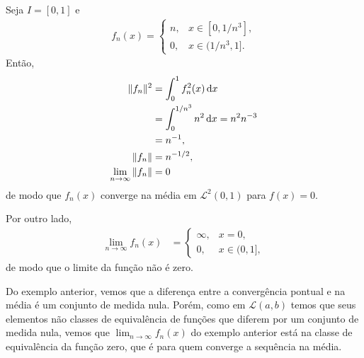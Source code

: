 \begin{exem}
    Seja $I = [0,1]$ e
    \begin{align*}
        f_n(x) = \begin{cases}
            n, & x \in [0, 1/n^3], \\
            0, & x \in (1/n^3, 1].
        \end{cases}
    \end{align*}
    Ent\~{a}o,
    \begin{align*}
        \| f_n \|^2 &= \int_0^1 f_n^2(x) \, \mathrm{d}x \\
        &= \int_0^{1/n^3} n^2 \, \mathrm{d}x = n^2 n^{-3} \\
        &= n^{-1}, \\
        \| f_n \| &= n^{-1/2}, \\
        \lim_{n \to \infty} \| f_n \| &= 0
    \end{align*}
    de modo que $f_n(x)$ converge na m\'{e}dia em $\mathcal{L}^2(0,1)$ para $f(x) = 0$.

    Por outro lado,
    \begin{align*}
        \lim_{n \to \infty} f_n(x) &= \begin{cases}
            \infty, & x = 0, \\
            0, & x \in (0,1],
        \end{cases}
    \end{align*}
    de modo que o limite da fun\c{c}\~{a}o n\~{a}o \'{e} zero.
\end{exem}

\begin{obs}
    Do exemplo anterior, vemos que a diferen\c{c}a entre a converg\^{e}ncia pontual e na m\'{e}dia \'{e} um conjunto de medida nula. Por\'{e}m, como em $\mathcal{L}(a,b)$ temos que seus elementos n\~{a}o classes de equival\^{e}ncia de fun\c{c}\~{o}es que diferem por um conjunto de medida nula, vemos que $\lim_{n \to \infty} f_n(x)$ do exemplo anterior est\'{a} na classe de equival\^{e}ncia da fun\c{c}\~{a}o zero, que \'{e} para quem converge a sequ\^{e}ncia na m\'{e}dia.
\end{obs}


